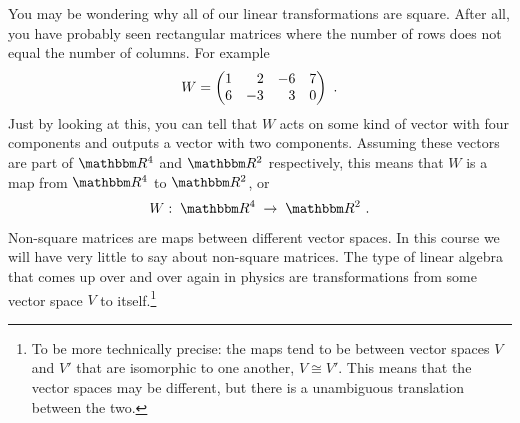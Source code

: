 \documentclass[12pt]{article}
\begin{document}
You may be wondering why all of our linear transformations are square. After all, you have probably seen rectangular matrices where the number of rows does not equal the number of columns. For example
\begin{align}
    W = 
    \begin{pmatrix}
        1 & \pp 2 &-6 & 7 \\
        6 & -3 & \pp 3 & 0
    \end{pmatrix} \ .
\end{align}
Just by looking at this, you can tell that $W$ acts on some kind of vector with four components and outputs a vector with two components. Assuming these vectors are part of $\RR ^4$ and $\RR ^2$ respectively, this means that $W$ is a map from $\RR ^4$ to $\RR ^2$, or
\begin{align}
    W:\; \RR ^4 \;\to \; \RR ^2 \ .
\end{align}
Non-square matrices are maps between different vector spaces. In this course we will have very little to say about non-square matrices. The type of linear algebra that comes up over and over again in physics are transformations from some vector space $V$ to itself.\footnote{To be more technically precise: the maps tend to be between vector spaces $V$ and $V'$ that are isomorphic to one another, $V\cong V'$. This means that the vector spaces may be different, but there is a unambiguous translation between the two.} 
\end{document}
